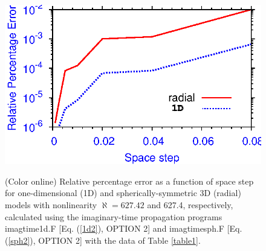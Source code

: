 \documentclass[onecolumn]{elsart3p}
\begin{document}
\begin{figure}[tbp] \begin{center}
{\includegraphics[width=.8\linewidth]{Fig1.eps}}
\end{center}
\caption{(Color online) Relative percentage error
as a function of
space step
for one-dimensional (1D)  and spherically-symmetric  3D (radial)
models with nonlinearity $\aleph %
=627.42$ and 627.4, respectively,
calculated using the imaginary-time propagation programs imagtime1d.F
[Eq. (\ref{1d2}), OPTION 2]
and imagtimesph.F [Eq. (\ref{sph2}), OPTION 2]
with the
data of
Table \ref{table1}.
}
\label{fg1}
\end{figure}
\end{document}
